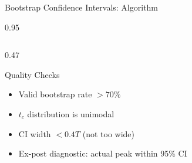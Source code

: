 \documentclass[9pt, aspectratio=169, t]{beamer}
\begin{document}
\begin{frame}{Bootstrap Confidence Intervals: Algorithm}
\begin{cminipage}{0.95\textwidth}
{\begin{columns}[T]
\begin{column}{0.47\textwidth}
            \begin{exampleblock}{Quality Checks}
                \begin{itemize}\setlength{\itemsep}{0pt}
                    \item Valid bootstrap rate $> 70\%$
                    \item $t_c$ distribution is unimodal
                    \item CI width $< 0.4T$ (not too wide)
                    \item Ex-post diagnostic: actual peak within 95\% CI
                \end{itemize}
            \end{exampleblock}
        \end{column}
    \end{columns}
    }
    \hfill{}
    \end{cminipage}
\end{frame}
\end{document}
